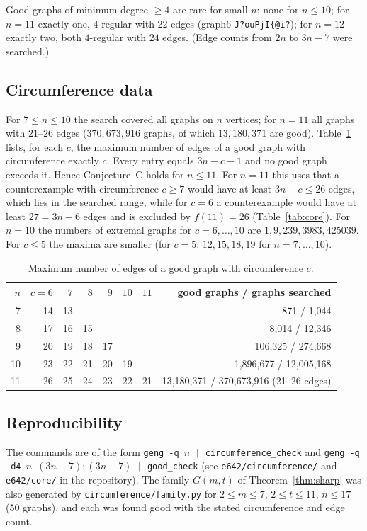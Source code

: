 \documentclass[11pt]{amsart}
\theoremstyle{remark}
\begin{document}
Good graphs of minimum degree $\ge4$ are rare for small $n$: none for $n\le10$; for $n=11$ exactly one, $4$-regular with $22$ edges (graph6 \texttt{J?ouPjI\{@i?}); for $n=12$ exactly two, both $4$-regular with $24$ edges. (Edge counts from $2n$ to $3n-7$ were searched.)

\subsection*{Circumference data}
For $7\le n\le10$ the search covered all graphs on $n$ vertices; for $n=11$ all graphs with $21$--$26$ edges ($370{,}673{,}916$ graphs, of which $13{,}180{,}371$ are good). Table~\ref{tab:circ} lists, for each $c$, the maximum number of edges of a good graph with circumference exactly $c$. Every entry equals $3n-c-1$ and no good graph exceeds it. Hence Conjecture~C holds for $n\le11$. For $n=11$ this uses that a counterexample with circumference $c\ge7$ would have at least $3n-c\le26$ edges, which lies in the searched range, while for $c=6$ a counterexample would have at least $27=3n-6$ edges and is excluded by $f(11)=26$ (Table~\ref{tab:core}). For $n=10$ the numbers of extremal graphs for $c=6,\dots,10$ are $1,9,239,3983,425039$. For $c\le5$ the maxima are smaller (for $c=5$: $12,15,18,19$ for $n=7,\dots,10$).

\begin{table}[h]
\caption{Maximum number of edges of a good graph with circumference $c$.}\label{tab:circ}
\begin{tabular}{rrrrrrrr}
\toprule
$n$ & $c=6$ & $7$ & $8$ & $9$ & $10$ & $11$ & good graphs / graphs searched\\
\midrule
7 & 14 & 13 & & & & & 871 / 1,044\\
8 & 17 & 16 & 15 & & & & 8,014 / 12,346\\
9 & 20 & 19 & 18 & 17 & & & 106,325 / 274,668\\
10 & 23 & 22 & 21 & 20 & 19 & & 1,896,677 / 12,005,168\\
11 & 26 & 25 & 24 & 23 & 22 & 21 & 13,180,371 / 370,673,916 (21--26 edges)\\
\bottomrule
\end{tabular}
\end{table}

\subsection*{Reproducibility}
The commands are of the form \texttt{geng -q $n$ | circumference\_check} and \texttt{geng -q -d4 $n$ $(3n-7){:}(3n-7)$ | good\_check} (see \texttt{e642/circumference/} and \texttt{e642/core/} in the repository). The family $G(m,t)$ of Theorem~\ref{thm:sharp} was also generated by \texttt{circumference/family.py} for $2\le m\le7$, $2\le t\le11$, $n\le17$ (50 graphs), and each was found good with the stated circumference and edge count.
\end{document}
